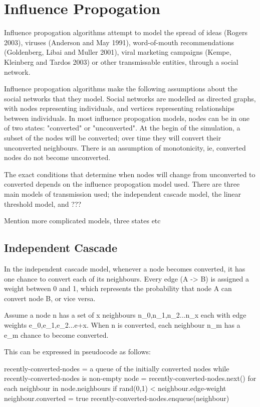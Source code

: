 \section{Influence Propogation}

 Influence propogation algorithms attempt to model the spread of ideas (Rogers 2003), viruses (Anderson and May 1991), word-of-mouth recommendations (Goldenberg, Libai and Muller 2001), viral marketing campaigns (Kempe, Kleinberg and Tardos 2003) or other transmissable entities, through a social network.

Influence propogation algorithms make the following assumptions about the social networks that they model. Social networks are modelled as directed graphs, with nodes representing individuals, and vertices representing relationships between individuals. In most influence propogation models, nodes can be in one of two states: "converted" or "unconverted". At the begin of the simulation, a subset of the nodes will be converted; over time they will convert their unconverted neighbours. There is an assumption of monotonicity, ie, converted nodes do not become unconverted.

 The exact conditions that determine when nodes will change from unconverted to converted depends on the influence propogation model used. There are three main models of transmission used; the independent cascade model, the linear threshold model, and ???

Mention more complicated models, three states etc

\subsection{Independent Cascade}
 In the independent cascade model, whenever a node becomes converted, it has one chance to convert each of its neighbours. Every edge (A -> B) is assigned a weight between 0 and 1, which represents the probability that node A can convert node B, or vice versa.

Assume a node n has a set of x neighbours n\_0,n\_1,n\_2...n\_x each with edge weights e\_0,e\_1,e\_2...e+x. When n is converted, each neighbour n\_m has a e\_m chance to become converted.

This can be expressed in pseudocode as follows:

recently-converted-nodes = a queue of the initially converted nodes
while recently-converted-nodes is non-empty {
  node = recently-converted-nodes.next()
  for each neighbour in node.neighbours {
    if rand(0,1) < neighbour.edge-weight {
      neighbour.converted = true
      recently-converted-nodes.enqueue(neighbour)
    }
  }
}

